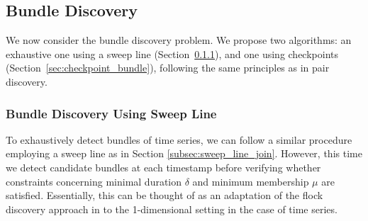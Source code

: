 \subsection{Bundle Discovery}
\label{sec:bundle_disc}
We now consider the bundle discovery problem. We propose two algorithms: an exhaustive one using a sweep line (Section~\ref{subsec:sweepline_bundle}), and one using checkpoints (Section~\ref{sec:checkpoint_bundle}), following the same principles as in pair discovery.



\subsubsection{Bundle Discovery Using Sweep Line}
\label{subsec:sweepline_bundle}
To exhaustively detect bundles of time series, we can follow a similar procedure employing a sweep line as in Section \ref{subsec:sweep_line_join}. However, this time we detect candidate bundles at each timestamp before verifying whether constraints concerning minimal duration $\delta$ and minimum membership $\mu$ are satisfied. Essentially, this can be thought of as an adaptation of the flock discovery approach in \cite{vieira2009line} to the 1-dimensional setting in the case of time series.


